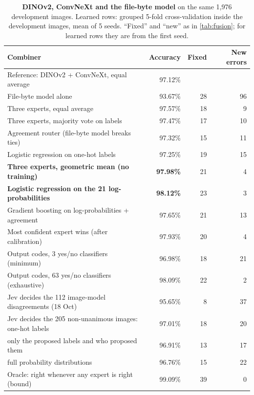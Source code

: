\begin{table}[t]
\centering\small
\caption{\textbf{DINOv2, ConvNeXt and the file-byte model} on the same 1{,}976 development images\rep. Learned rows: grouped 5-fold cross-validation inside the development images, mean of 5 seeds. ``Fixed'' and ``new'' as in \cref{tab:fusion}; for learned rows they are from the first seed.}
\label{tab:fusion3}
\begin{tabular}{@{}lrrr@{}}
\toprule
Combiner & Accuracy & Fixed & New errors\\
\midrule
\rowcolor{panel}Reference: DINOv2 + ConvNeXt, equal average & 97.12\% & & \\
File-byte model alone & 93.67\% & 28 & 96\\
Three experts, equal average & 97.57\% & 18 & 9\\
Three experts, majority vote on labels & 97.47\% & 17 & 10\\
Agreement router (file-byte model breaks ties) & 97.32\% & 15 & 11\\
Logistic regression on one-hot labels & 97.25\% & 19 & 15\\
\textbf{Three experts, geometric mean (no training)} & \textbf{97.98\%} & 21 & 4\\
\textbf{Logistic regression on the 21 log-probabilities} & \textbf{98.12\%} & 23 & 3\\
Gradient boosting on log-probabilities + agreement & 97.65\% & 21 & 13\\
Most confident expert wins (after calibration) & 97.93\% & 20 & 4\\
Output codes, 3 yes/no classifiers (minimum) & 96.98\% & 18 & 21\\
Output codes, 63 yes/no classifiers (exhaustive) & 98.09\% & 22 & 2\\
Jev decides the 112 image-model disagreements (18 Oct) & 95.65\% & 8 & 37\\
Jev decides the 205 non-unanimous images: one-hot labels & 97.01\% & 18 & 20\\
\quad only the proposed labels and who proposed them & 96.91\% & 13 & 17\\
\quad full probability distributions & 96.76\% & 15 & 22\\
Oracle: right whenever any expert is right (bound) & 99.09\% & 39 & 0\\
\bottomrule
\end{tabular}
\end{table}
